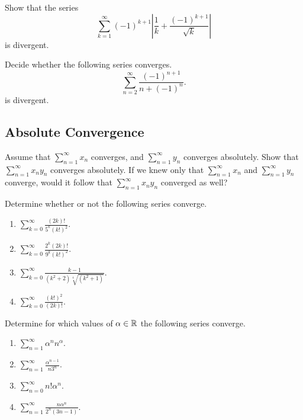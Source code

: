 \documentclass[10pt, a4paper]{article}
\renewcommand{\infsum}[1][n = 1]{\sum_{#1}^{\infty}}
\begin{document}
\begin{example}
    Show that the series
    \[
    \sum_{k = 1}^{\infty} (-1)^{k + 1} \left|\frac{1}{k} + \frac{(-1) ^ {k + 1}}{\sqrt{k}}\right|
    \]
    is divergent.
\end{example}

\begin{example}
    Decide whether the following series converges.
    \[
    \sum_{n = 2}^{\infty} \frac{(-1)^{n + 1}}{n + (-1) ^ n}.
    \]
    is divergent.
\end{example}

\subsection{Absolute Convergence}

\begin{example}
    Assume that $\infsum x_n$ converges, and $\infsum y_n$ converges absolutely. Show that $\infsum x_ny_n$ converges absolutely. If we knew only that $\infsum x_n$ and $\infsum y_n$ converge, would it follow that $\infsum x_ny_n$ converged as well?
\end{example}

\begin{example}
    Determine whether or not the following series converge.
    \begin{enumerate}[label = \alph*.]
        \item $\displaystyle \infsum[k = 0]\frac{(2k)!}{5 ^ k (k!) ^ 2}.$
        \item $\displaystyle \infsum[k = 0]\frac{2 ^ k (2k)!}{9 ^ k (k!) ^ 2}.$
        \item $\displaystyle \infsum[k = 0]\frac{k - 1}{(k ^ 2 + 2)\sqrt[4]{(k ^ 2 + 1)}}.$
        \item $\displaystyle \infsum[k = 0]\frac{(k!) ^ 2}{(2k)!}.$
    \end{enumerate}
\end{example}

\begin{example}
    Determine for which values of $\alpha \in \mathbb{R}$ the following series converge.
    \begin{enumerate}[label = \alph*.]
        \item $\displaystyle \infsum\alpha ^ n n ^ \alpha.$
        \item $\displaystyle \infsum\frac{\alpha ^ {n - 1}}{n 3 ^ n}.$
        \item $\displaystyle \infsum[n = 0] n! \alpha ^ n.$
        \item $\displaystyle \infsum\frac{n \alpha ^ n}{2 ^ n (3n - 1)}.$
    \end{enumerate}
\end{example}
\end{document}
